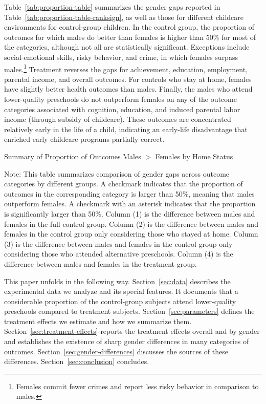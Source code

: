 Table~\ref{tab:proportion-table} summarizes the gender gaps reported in Table~\ref{tab:proportion-table-ranksign}, as well as those for different childcare environments for control-group children. In the control group, the proportion of outcomes for which males do better than females is higher than 50\% for most of the categories, although not all are statistically significant. Exceptions include social-emotional skills, risky behavior, and crime, in which females surpass males.\footnote{Females commit fewer crimes and report less risky behavior in comparison to males.} Treatment reverses the gaps for achievement, education, employment, parental income, and overall outcomes. For controls who stay at home, females have slightly better health outcomes than males. Finally, the males who attend lower-quality preschools do not outperform females on any of the outcome categories associated with cognition, education, and induced parental labor income (through subsidy of childcare). These outcomes are concentrated relatively early in the life of a child, indicating an early-life disadvantage that enriched early childcare programs partially correct.

\begin{table}[H]
\centering
\caption{Summary of Proportion of Outcomes Males $>$ Females by Home Status}
\label{tab:proportion-table}
\begin{threeparttable}

\begin{tablenotes}
\footnotesize
\item Note: This table summarizes comparison of gender gaps across outcome categories by different groups. A checkmark indicates that the proportion of outcomes in the corresponding category is larger than 50\%, meaning that males outperform females. A checkmark with an asterisk indicates that the proportion is significantly larger than 50\%. Column (1) is the difference between males and females in the full control group.  Column (2) is the difference between males and females in the control group only considering those who stayed at home. Column (3) is the difference between males and females in the control group only considering those who attended alternative preschools. Column (4) is the difference between males and females in the treatment group.
\end{tablenotes}
\end{threeparttable}
\end{table}

This paper unfolds in the following way. Section~\ref{sec:data} describes the experimental data we analyze and its special features. It documents that a considerable proportion of the control-group subjects attend lower-quality preschools compared to treatment subjects. Section~\ref{sec:parameters} defines the treatment effects we estimate and how we summarize them. Section~\ref{sec:treatment-effects} reports the treatment effects overall and by gender and establishes the existence of sharp gender differences in many categories of outcomes. Section~\ref{sec:gender-differences} discusses the sources of these differences. Section~\ref{sec:conclusion} concludes.


